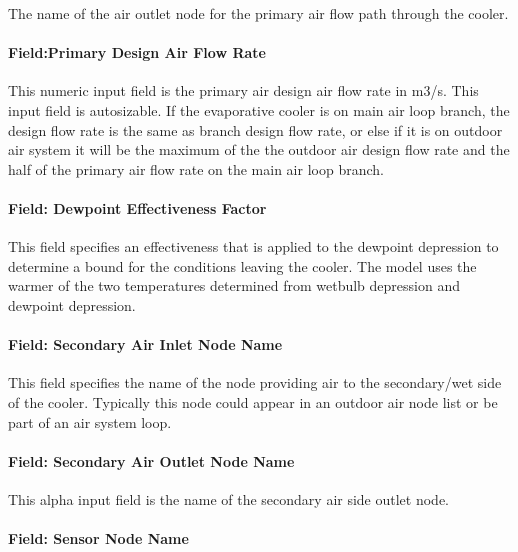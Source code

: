 The name of the air outlet node for the primary air flow path through the cooler.

\paragraph{Field:Primary Design Air Flow Rate}\label{fieldprimary-design-air-flow-rate-1}

This numeric input field is the primary air design air flow rate in m3/s. This input field is autosizable. If the evaporative cooler is on main air loop branch, the design flow rate is the same as branch design flow rate, or else if it is on outdoor air system it will be the maximum of the the outdoor air design flow rate and the half of the primary air flow rate on the main air loop branch.

\paragraph{Field: Dewpoint Effectiveness Factor}\label{field-dewpoint-effectiveness-factor}

This field specifies an effectiveness that is applied to the dewpoint depression to determine a bound for the conditions leaving the cooler. The model uses the warmer of the two temperatures determined from wetbulb depression and dewpoint depression.

\paragraph{Field: Secondary Air Inlet Node Name}\label{field-secondary-air-inlet-node-name-2}

This field specifies the name of the node providing air to the secondary/wet side of the cooler. Typically this node could appear in an outdoor air node list or be part of an air system loop.

\paragraph{Field: Secondary Air Outlet Node Name}\label{field-secondary-air-outlet-node-name}

This alpha input field is the name of the secondary air side outlet node.

\paragraph{Field: Sensor Node Name}\label{field-sensor-node-name-1}

